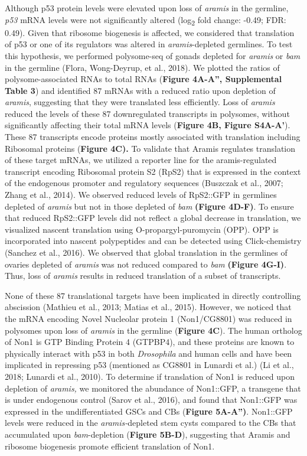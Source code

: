 \documentclass[12pt,twoside]{reedthesis}
\begin{document}
Although p53 protein levels were elevated upon loss of \emph{aramis} in the
germline, \emph{p53} mRNA levels were not significantly altered (log\textsubscript{2} fold
change: -0.49; FDR: 0.49). Given that ribosome biogenesis is affected,
we considered that translation of p53 or one of its regulators was
altered in \emph{aramis}-depleted germlines. To test this hypothesis, we
performed polysome-seq of gonads depleted for \emph{aramis} or \emph{bam} in the
germline (Flora, Wong-Deyrup, et al., 2018). We plotted the ratios of polysome-associated
RNAs to total RNAs (\textbf{Figure 4A-A'', Supplemental Table 3}) and
identified 87 mRNAs with a reduced ratio upon depletion of \emph{aramis},
suggesting that they were translated less efficiently. Loss of \emph{aramis}
reduced the levels of these 87 downregulated transcripts in polysomes,
without significantly affecting their total mRNA levels (\textbf{Figure 4B,
Figure S4A-A'}). These 87 transcripts encode proteins mostly associated
with translation including Ribosomal proteins (\textbf{Figure 4C).} To
validate that Aramis regulates translation of these target mRNAs, we
utilized a reporter line for the aramis-regulated transcript encoding
Ribosomal protein S2 (RpS2) that is expressed in the context of the
endogenous promoter and regulatory sequences
(Buszczak et al., 2007; Zhang et al., 2014). We observed reduced
levels of RpS2::GFP in germlines depleted of \emph{aramis} but not in those
depleted of \emph{bam} \textbf{(Figure 4D-F)}. To ensure that reduced RpS2::GFP
levels did not reflect a global decrease in translation, we visualized
nascent translation using O-propargyl-puromycin (OPP). OPP is
incorporated into nascent polypeptides and can be detected using
Click-chemistry (Sanchez et al., 2016). We observed that global translation
in the germlines of ovaries depleted of \emph{aramis} was not reduced
compared to \emph{bam} \textbf{(Figure 4G-I)}. Thus, loss of \emph{aramis} results in
reduced translation of a subset of transcripts.

None of these 87 translational targets have been implicated in directly
controlling abscission (Mathieu et al., 2013; Matias et al., 2015). However, we
noticed that the mRNA encoding Novel Nucleolar protein 1 (Non1/CG8801)
was reduced in polysomes upon loss of \emph{aramis} in the germline (\textbf{Figure
4C}). The human ortholog of Non1 is GTP Binding Protein 4 (GTPBP4), and
these proteins are known to physically interact with p53 in both
\emph{Drosophila} and human cells and have been implicated in repressing p53
(mentioned as CG8801 in Lunardi et al.) (Li et al., 2018; Lunardi et al., 2010).
To determine if translation of Non1 is reduced upon depletion of
\emph{aramis,} we monitored the abundance of Non1::GFP, a transgene that is
under endogenous control (Sarov et al., 2016), and
found that Non1::GFP was expressed in the undifferentiated GSCs and CBs
(\textbf{Figure 5A-A'')}. Non1::GFP levels were reduced in the
\emph{aramis-}depleted stem cysts compared to the CBs that accumulated upon
\emph{bam}-depletion (\textbf{Figure 5B-D}), suggesting that Aramis and ribosome
biogenesis promote efficient translation of Non1.
\end{document}

